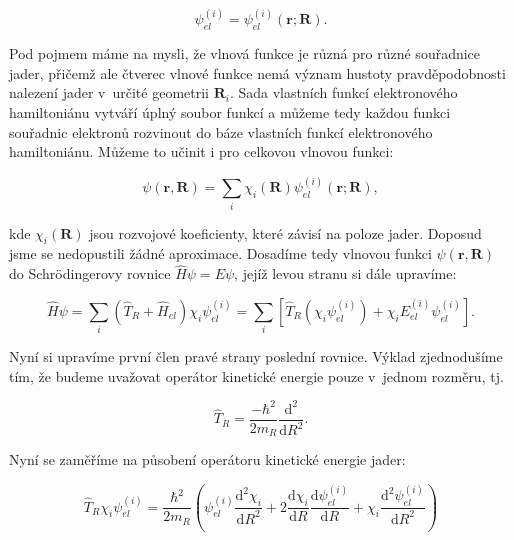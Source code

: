 \begin{equation}
\psi_{el}^{(i)}=\psi_{el}^{(i)}(\textbf{r}; \textbf{R}).
\end{equation}

\noindent Pod pojmem  máme na mysli, že vlnová funkce je různá pro různé souřadnice jader, přičemž ale čtverec vlnové funkce nemá význam hustoty pravděpodobnosti nalezení jader v~určité geometrii $\textbf{R}_i$. Sada vlastních funkcí elektronového hamiltoniánu vytváří úplný soubor funkcí a můžeme tedy každou funkci souřadnic elektronů rozvinout do báze vlastních funkcí elektronového hamiltoniánu. Můžeme to učinit i pro celkovou vlnovou funkci: 

\begin{equation}
\psi(\textbf{r},\textbf{R})=\sum_i \chi_i(\textbf{R})\psi_{el}^{(i)}(\textbf{r}; \textbf{R}),
\label{rov:mol-BO2}
\end{equation}

\noindent kde $\chi_i(\textbf{R})$ jsou rozvojové koeficienty, které závisí na poloze jader. Doposud jsme se nedopustili žádné aproximace. Dosadíme tedy vlnovou funkci $\psi(\textbf{r},\textbf{R})$ do Schrödingerovy rovnice $\hat{H}\psi=E\psi$, jejíž levou stranu si dále upravíme:

\begin{equation}
\hat{H}\psi=\sum_i (\hat{T}_R+\hat{H}_{el})\chi_i\psi_{el}^{(i)}=\sum_i \left[\hat{T}_R(\chi_i\psi_{el}^{(i)}) + \chi_iE_{el}^{(i)}\psi_{el}^{(i)}\right].
\label{rov:mol-mat2}
\end{equation}

\noindent Nyní si upravíme první člen pravé strany poslední rovnice. Výklad zjednodušíme tím, že budeme uvažovat operátor kinetické energie pouze v~jednom rozměru, tj. 

\begin{displaymath}
\hat{T}_R=\frac{-\hbar^2}{2m_R}\frac{\mathrm{d}^2}{\mathrm{d}R^2}.
\end{displaymath}

\noindent Nyní se zaměříme na působení operátoru kinetické energie jader:

\begin{equation}
\hat{T}_R\chi_i\psi_{el}^{(i)}=\frac{\hbar^2}{2m_R}\left(
\psi_{el}^{(i)}\frac{\mathrm{d}^2\chi_i}{\mathrm{d}R^2}
+2\frac{\mathrm{d}\chi_i}{\mathrm{d}R}\frac{\mathrm{d}\psi_{el}^{(i)}}{\mathrm{d}R}+\chi_i\frac{\mathrm{d}^2\psi_{el}^{(i)}}{\mathrm{d}R^2}
\right)
\label{rov:mol-BOmat}
\end{equation}

